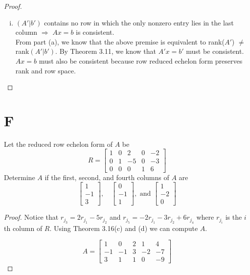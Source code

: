 \documentclass[11pt]{scrartcl}
\begin{document}
\begin{enumerate}[label=\alph*.]
{\begin{proof}
\begin{enumerate}[i.]
{					rank and row space preserving operation. Thus, $(A'|b')$ contains no row in which the only nonzero entry lies in the last column
					because $b'$ is a linearly dependent.
				}
				\item{
					$(A'|b')$ contains no row in which the only nonzero entry lies
					in the last column $\Rightarrow$ $Ax = b$ is consistent.\\
					From part (a), we know that the above premise is equivalent to rank($A'$) $\neq$ rank$(A'|b')$. By Theorem 3.11, 
					we know that $A'x=b'$ must be consistent. $Ax = b$ must also be consistent because row reduced echelon form preserves rank and row space.
				}
			\end{enumerate}
		\end{proof}
	}
\end{enumerate}


\section{F}
Let the reduced row echelon form of $A$ be
\[ R = \begin{bmatrix}
	1 & 0 & 2 & 0 & -2 \\
	0 & 1 & -5 & 0 & -3 \\
	0 & 0 & 0 & 1 & 6
\end{bmatrix}\]
Determine $A$ if the first, second, and fourth columns of $A$ are
$$
\begin{bmatrix}
1 \\
-1 \\
3
\end{bmatrix}, \quad \begin{bmatrix}
0 \\
-1 \\
1
\end{bmatrix}, \text { and } \begin{bmatrix}
1 \\
-2 \\
0
\end{bmatrix}
$$
\begin{proof}
Notice that $r_{j_{3}} = 2r_{j_{1}} - 5r_{j_{2}}$ and $r_{j_{5}} = -2r_{j_{1}} - 3r_{j_{2}} + 6r_{j_{4}}$ where $r_{j_{i}}$ is the 
$i$th column of $R$. Using Theorem 3.16(c) and (d) we can compute $A$. 

\[ A = \begin{bmatrix}
	1  & 0  & 2  & 1  & 4\\
	-1 & -1 & 3 & -2 & -7 \\
	3  & 1  & 1  & 0  & -9
\end{bmatrix}\]

\end{proof}
\end{document}
